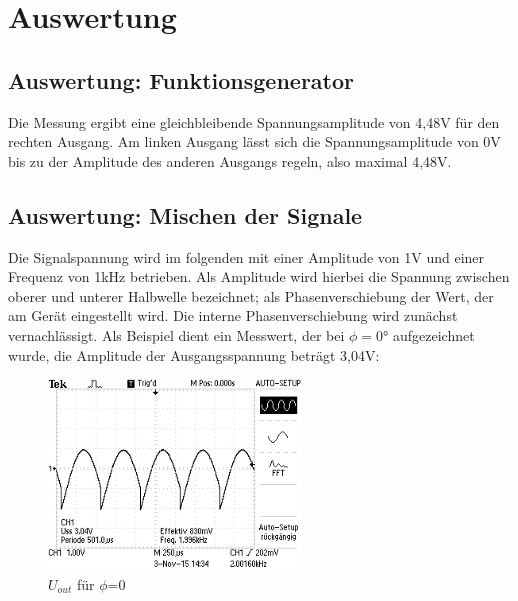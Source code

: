 \section{Auswertung}
\label{sec:Auswertung}

\subsection{Auswertung: Funktionsgenerator}
Die Messung ergibt eine gleichbleibende Spannungsamplitude von 4,48V für den
rechten Ausgang.
Am linken Ausgang lässt sich die Spannungsamplitude von 0V
bis zu der Amplitude des
anderen Ausgangs regeln, also maximal 4,48V.

\subsection{Auswertung: Mischen der Signale}

Die Signalspannung wird im folgenden mit einer Amplitude von 1V und einer
Frequenz von 1kHz betrieben. Als Amplitude wird hierbei die Spannung zwischen
oberer und unterer Halbwelle bezeichnet; als Phasenverschiebung der Wert, der am
Gerät eingestellt wird. Die interne Phasenverschiebung wird zunächst
vernachlässigt. Als Beispiel dient ein Messwert, der bei $\phi = 0°$
aufgezeichnet wurde, die Amplitude der Ausgangsspannung beträgt 3,04V:
\begin{figure}[H]
  \centering
  \includegraphics[angle=90,height=0.3\textwidth,width=0.6\textwidth]
  {graphics/ALL0031/F0031TEK.jpg}
  \caption{$U_{out}$ für $\phi$=0}
  \label{fig:2/phi0}
\end{figure}

